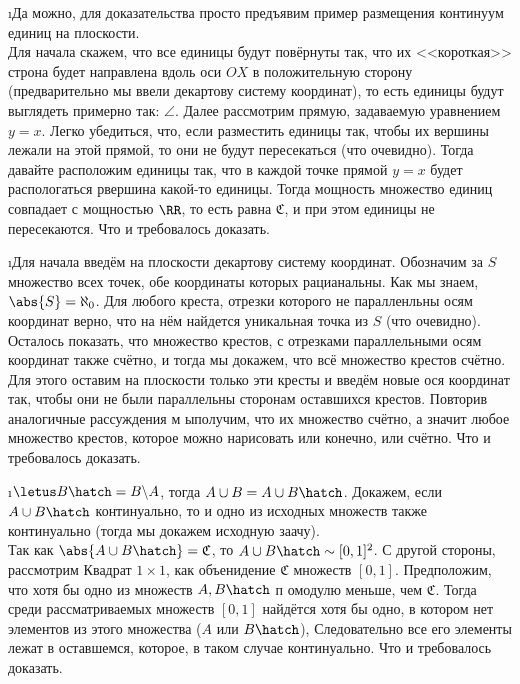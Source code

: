 \i Да можно, для доказательства просто предъявим пример размещения континуум единиц на плоскости.\\
Для начала скажем, что все единицы будут повёрнуты так, что их <<короткая>> строна будет направлена вдоль оси $OX$ в положительную сторону (предварительно мы ввели декартову систему координат), то есть единицы будут выглядеть примерно так: $\angle$. Далее рассмотрим прямую, задаваемую уравнением $y = x$. Легко убедиться, что, если разместить единицы так, чтобы их вершины лежали на этой прямой, то они не будут пересекаться (что очевидно). Тогда давайте расположим единицы так, что в каждой точке прямой $y = x$ будет распологаться рвершина какой-то единицы. Тогда мощность множество единиц совпадает с мощностью $\RR$, то есть равна $\mathfrak{C}$, и при этом единицы не пересекаются. Что и требовалось доказать.

\i Для начала введём на плоскости декартову систему координат. Обозначим за $S$ множество всех точек, обе координаты которых рацианальны. Как мы знаем, $\abs{S} = \aleph_0$. Для любого креста, отрезки которого не паралленльны осям координат верно, что на нём найдется уникальная точка из $S$ (что очевидно). Осталось показать, что множество крестов, с отрезками параллельными осям координат также счётно, и тогда мы докажем, что всё множество крестов счётно. Для этого оставим на плоскости только эти кресты и введём новые ося координат так, чтобы они не были параллельны сторонам оставшихся крестов. Повторив аналогичные рассуждения м ыполучим, что их множество счётно, а значит любое множество крестов, которое можно нарисовать или конечно, или счётно. Что и требовалось доказать.

\i $\letus B\hatch = B \backslash A$, тогда $A \cup B = A \cup B\hatch$. Докажем, если $A \cup B\hatch$ континуально, то и одно из исходных множеств также континуально (тогда мы докажем исходную заачу).\\
Так как $\abs{A \cup B\hatch} = \mathfrak{C}$, то $A \cup B\hatch \sim [0, 1]^2$. С другой стороны, рассмотрим Квадрат $1 \times 1$, как объенидение $\mathfrak{C}$ множеств $[0, 1]$. Предположим, что хотя бы одно из множеств $A, B\hatch$ п омодулю меньше, чем $\mathfrak{C}$. Тогда среди рассматриваемых множеств $[0, 1]$ найдётся хотя бы одно, в котором нет элементов из этого множества ($A$ или $B\hatch$), Следовательно все его элементы лежат в оставшемся, которое, в таком случае континуально. Что и требовалось доказать.
